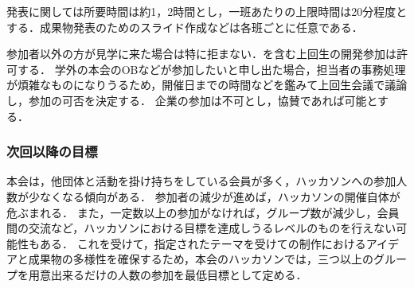 発表に関しては所要時間は約1，2時間とし，一班あたりの上限時間は20分程度とする．成果物発表のためのスライド作成などは各班ごとに任意である．

参加者以外の方が見学に来た場合は特に拒まない．\fourthGrade{}を含む上回生の開発参加は許可する．
学外の本会のOBなどが参加したいと申し出た場合，担当者の事務処理が煩雑なものになりうるため，開催日までの時間などを鑑みて上回生会議で議論し，参加の可否を決定する．
企業の参加は不可とし，協賛であれば可能とする．

\subsubsection*{次回以降の目標}
本会は，他団体と活動を掛け持ちをしている会員が多く，ハッカソンへの参加人数が少なくなる傾向がある．
参加者の減少が進めば，ハッカソンの開催自体が危ぶまれる．
また，一定数以上の参加がなければ，グループ数が減少し，会員間の交流など，ハッカソンにおける目標を達成しうるレベルのものを行えない可能性もある．
これを受けて，指定されたテーマを受けての制作におけるアイデアと成果物の多様性を確保するため，本会のハッカソンでは，三つ以上のグループを用意出来るだけの人数の参加を最低目標として定める．
